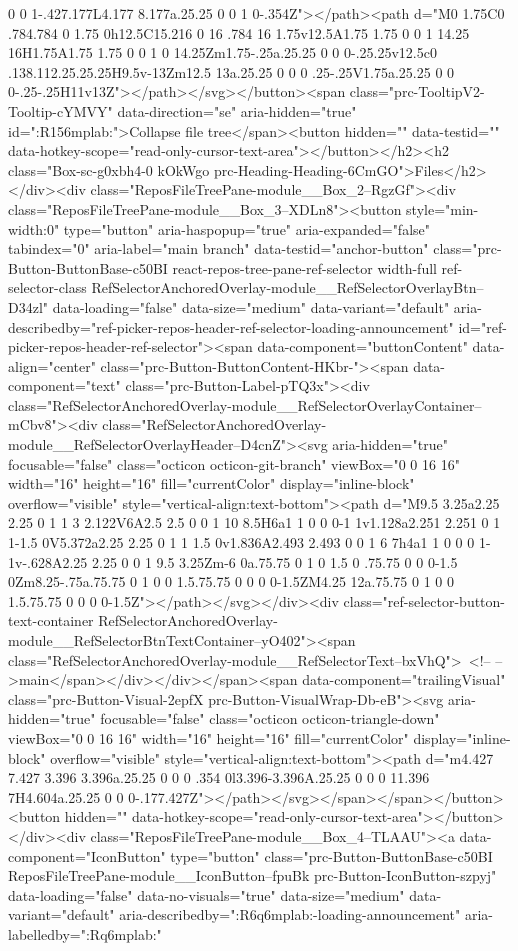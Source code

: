 {{{{{{{{{{{{{{{{{{{{{{{{{{{{{0 0 1-.427.177L4.177 8.177a.25.25 0 0 1 0-.354Z"></path><path d="M0 1.75C0 .784.784 0 1.75 0h12.5C15.216 0 16 .784 16 1.75v12.5A1.75 1.75 0 0 1 14.25 16H1.75A1.75 1.75 0 0 1 0 14.25Zm1.75-.25a.25.25 0 0 0-.25.25v12.5c0 .138.112.25.25.25H9.5v-13Zm12.5 13a.25.25 0 0 0 .25-.25V1.75a.25.25 0 0 0-.25-.25H11v13Z"></path></svg></button><span class="prc-TooltipV2-Tooltip-cYMVY" data-direction="se" aria-hidden="true" id=":R156mplab:">Collapse file tree</span><button hidden="" data-testid="" data-hotkey-scope="read-only-cursor-text-area"></button></h2><h2 class="Box-sc-g0xbh4-0 kOkWgo prc-Heading-Heading-6CmGO">Files</h2></div><div class="ReposFileTreePane-module__Box_2--RgzGf"><div class="ReposFileTreePane-module__Box_3--XDLn8"><button style="min-width:0" type="button" aria-haspopup="true" aria-expanded="false" tabindex="0" aria-label="main branch" data-testid="anchor-button" class="prc-Button-ButtonBase-c50BI react-repos-tree-pane-ref-selector width-full ref-selector-class RefSelectorAnchoredOverlay-module__RefSelectorOverlayBtn--D34zl" data-loading="false" data-size="medium" data-variant="default" aria-describedby="ref-picker-repos-header-ref-selector-loading-announcement" id="ref-picker-repos-header-ref-selector"><span data-component="buttonContent" data-align="center" class="prc-Button-ButtonContent-HKbr-"><span data-component="text" class="prc-Button-Label-pTQ3x"><div class="RefSelectorAnchoredOverlay-module__RefSelectorOverlayContainer--mCbv8"><div class="RefSelectorAnchoredOverlay-module__RefSelectorOverlayHeader--D4cnZ"><svg aria-hidden="true" focusable="false" class="octicon octicon-git-branch" viewBox="0 0 16 16" width="16" height="16" fill="currentColor" display="inline-block" overflow="visible" style="vertical-align:text-bottom"><path d="M9.5 3.25a2.25 2.25 0 1 1 3 2.122V6A2.5 2.5 0 0 1 10 8.5H6a1 1 0 0 0-1 1v1.128a2.251 2.251 0 1 1-1.5 0V5.372a2.25 2.25 0 1 1 1.5 0v1.836A2.493 2.493 0 0 1 6 7h4a1 1 0 0 0 1-1v-.628A2.25 2.25 0 0 1 9.5 3.25Zm-6 0a.75.75 0 1 0 1.5 0 .75.75 0 0 0-1.5 0Zm8.25-.75a.75.75 0 1 0 0 1.5.75.75 0 0 0 0-1.5ZM4.25 12a.75.75 0 1 0 0 1.5.75.75 0 0 0 0-1.5Z"></path></svg></div><div class="ref-selector-button-text-container RefSelectorAnchoredOverlay-module__RefSelectorBtnTextContainer--yO402"><span class="RefSelectorAnchoredOverlay-module__RefSelectorText--bxVhQ"> <!-- -->main</span></div></div></span><span data-component="trailingVisual" class="prc-Button-Visual-2epfX prc-Button-VisualWrap-Db-eB"><svg aria-hidden="true" focusable="false" class="octicon octicon-triangle-down" viewBox="0 0 16 16" width="16" height="16" fill="currentColor" display="inline-block" overflow="visible" style="vertical-align:text-bottom"><path d="m4.427 7.427 3.396 3.396a.25.25 0 0 0 .354 0l3.396-3.396A.25.25 0 0 0 11.396 7H4.604a.25.25 0 0 0-.177.427Z"></path></svg></span></span></button><button hidden="" data-hotkey-scope="read-only-cursor-text-area"></button></div><div class="ReposFileTreePane-module__Box_4--TLAAU"><a data-component="IconButton" type="button" class="prc-Button-ButtonBase-c50BI ReposFileTreePane-module__IconButton--fpuBk prc-Button-IconButton-szpyj" data-loading="false" data-no-visuals="true" data-size="medium" data-variant="default" aria-describedby=":R6q6mplab:-loading-announcement" aria-labelledby=":Rq6mplab:" }}}}}}}}}}}}}}}}}}}}}}}}}}}}}
